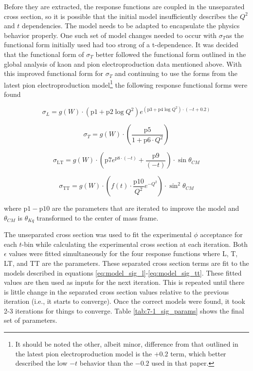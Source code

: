 \documentclass[
]{report}
\begin{document}
Before they are extracted, the response functions are coupled in the
unseparated cross section, so it is possible that the initial model
insufficiently describes the \(Q^2\) and \(t\) dependencies. The model
needs to be adapted to encapsulate the physics behavior properly. One
such set of model changes needed to occur with \(\sigma_T\)as the
functional form initially used had too strong of a t-dependence. It was
decided that the functional form of \(\sigma_T\) better followed the
functional form outlined in the global analysis of kaon and pion
electroproduction data mentioned above. With this improved functional
form for \(\sigma_T\) and continuing to use the forms from the latest
pion electroproduction
model\footnote{It should be noted the other, albeit minor, difference from that outlined in the latest pion electroproduction model is the $+0.2$ term, which better described the low $-t$ behavior than the $-0.2$ used in that paper. }
the following response functional forms were found

\begin{equation} 
    \sigma_L=g(W)\cdot(\mathrm{p1}+\mathrm{p2}\log{Q^2})e^{(\mathrm{p3}+\mathrm{p4}\log{Q^2})\cdot(-t+0.2)}
  \label{eq:model_sig_l} 
\end{equation}

\begin{equation} 
    \sigma_T=g(W)\cdot(\frac{\mathrm{p5}}{1+\mathrm{p6}\cdot Q^2})
  \label{eq:model_sig_t} 
\end{equation}

\begin{equation} 
    \sigma_\mathrm{LT}=g(W)\cdot(\mathrm{p7}e^{\mathrm{p8}\cdot(-t)}+\frac{\mathrm{p9}}{(-t)})\cdot\sin{\theta_{CM}}
  \label{eq:model_sig_lt} 
\end{equation}

\begin{equation} 
    \sigma_\mathrm{TT}=g(W)\cdot(f(t)\cdot\frac{\mathrm{p10}}{Q^2}e^{-Q^2})\cdot\sin^2{\theta_{CM}}
  \label{eq:model_sig_tt} 
\end{equation}

\noindent where \(\mathrm{p1}-\mathrm{p10}\) are the parameters that are
iterated to improve the model and \(\theta_{CM}\) is \(\theta_{Kq}\)
transformed to the center of mass frame.



The unseparated cross section was used to fit the experimental \(\phi\)
acceptance for each \(t\)-bin while calculating the experimental cross
section at each iteration. Both \(\epsilon\) values were fitted
simultaneously for the four response functions where L, T, LT, and TT
are the parameters. These separated cross section terms are fit to the
models described in equations
\ref{eq:model_sig_l}-\ref{eq:model_sig_tt}. These fitted values are then
used as inputs for the next iteration. This is repeated until there is
little change in the separated cross section values relative to the
previous iteration (i.e., it starts to converge). Once the correct
models were found, it took 2-3 iterations for things to converge. Table
\ref{tab:7-1_sig_params} shows the final set of parameters.
\end{document}
